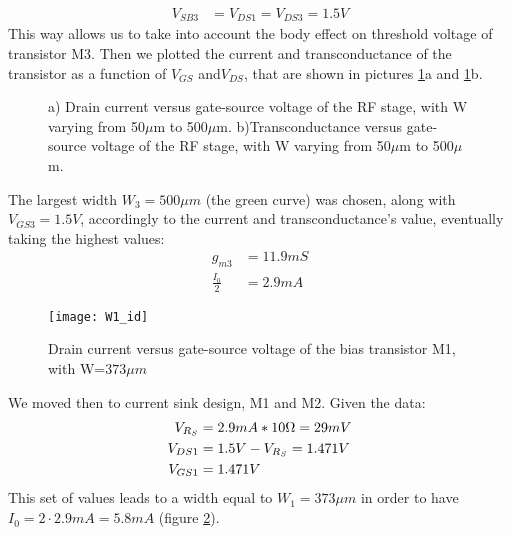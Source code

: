 \begin{align}
	V_{SB3} &= V_{DS1} = V_{DS3} = 1.5 V \nonumber 
\end{align}
This way allows us to take into account the body effect on threshold voltage of transistor M3.
Then we plotted the current and transconductance of the transistor as a function of \(V_{GS}\) and\(V_{DS}\), that are shown in pictures \ref{fig:W_2_id_gm}a and \ref{fig:W_2_id_gm}b.
\begin{figure}[H] 
	\centering
	\subfloat[][\emph{}]{\texttt{[image: W2\_id]}} \quad
	\subfloat[][\emph{}]{\texttt{[image: W2\_gm]}}
	\caption{ a) Drain current versus gate-source voltage of the RF stage, with W varying from 50\(\mu\)m to 500\(\mu\)m. b)Transconductance versus gate-source voltage of the RF stage, with W varying from 50\(\mu\)m to 500\(\mu\)m.}
	\label{fig:W_2_id_gm}
\end{figure}
The largest width  \(W_3=500\mu m\) (the green curve) was chosen, along with \(V_{GS3}=1.5V\), accordingly to the current and transconductance's value, eventually taking the highest values:
\begin{align}
	g_{m3}&=11.9mS \nonumber \\
	\frac{I_0}{2}&=2.9mA \nonumber
\end{align}
\begin{figure}[H]
	\centering
	\texttt{[image: W1\_id]}
	\caption{Drain current versus gate-source voltage of the bias transistor M1, with W=\(373\mu m\)}
	\label{W1_id}
\end{figure}
We moved then to current sink design, M1 and M2. Given the data:
\begin{align}
	V_{R_S} &= 2.9mA*10\ohm=29mV \notag \\
	V_{DS1}&=1.5V-V_{R_S}=1.471V \notag \\
	V_{GS1}&=1.471V \notag
\end{align}
This set of values leads to a width equal to \(W_1=373\mu m\) in order to have \(I_0=2\cdot2.9mA=5.8mA\) (figure \ref{W1_id}).

